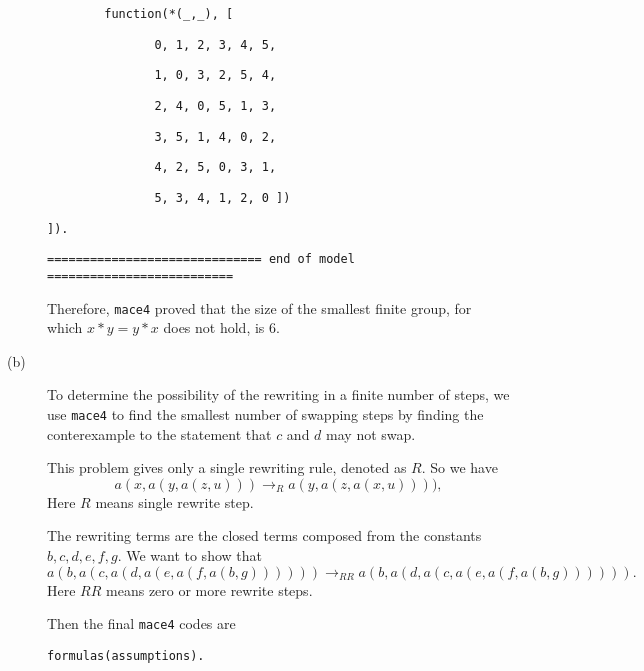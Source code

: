 \begin{description}
{\tt \ \ \ \ \ \ \ \ function(*(\_,\_), [}

{\tt \	\	\	\ \ \ \	\	\	\ \ \ \ \ \ 0, 1, 2, 3, 4, 5,}

{\tt \	\	\	\ \ \ \	\	\	\ \ \ \ \ \ 1, 0, 3, 2, 5, 4,}

{\tt \	\	\	\ \ \ \	\	\	\ \ \ \ \ \ 2, 4, 0, 5, 1, 3,}
	
{\tt \	\	\	\ \ \ \	\	\	\ \ \ \ \ \ 3, 5, 1, 4, 0, 2,}

{\tt \	\	\	\ \ \ \	\	\	\ \ \ \ \ \ 4, 2, 5, 0, 3, 1,}

{\tt \	\	\	\ \ \ \	\	\	\ \ \ \ \ \ 5, 3, 4, 1, 2, 0 ])}

{\tt ]).}

{\tt ============================== end of model ==========================}

\vspace{2mm}

Therefore, {\tt mace4} proved that the size of the smallest finite group, for which $ x \ast y = y \ast x $ does not hold, is 6.

  \item[(b)] To determine the possibility of the rewriting in a finite number of steps, we use {\tt mace4} to find the smallest number of swapping steps by finding the conterexample to the statement that $c$ and $d$ may not swap.

  This problem gives only a single rewriting rule, denoted as $R$. So we have \[ a(x, a(y, a(z, u))) \rightarrow_{R} a(y, a(z, a(x, u)))), \]
  Here $R$ means single rewrite step.

  The rewriting terms are the closed terms composed from the constants $b, c, d, e, f, g$. We want to show that
  \[ a(b, a(c, a(d, a(e, a(f, a(b, g)))))) \rightarrow_{RR} a(b, a(d, a(c, a(e, a(f, a(b, g)))))). \]
  Here $RR$ means zero or more rewrite steps.



      Then the final {\tt mace4} codes are

\vspace{2mm}

{\footnotesize

{\tt formulas(assumptions).}




}
\end{description}
